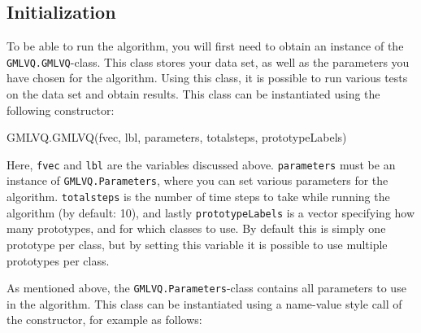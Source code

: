 \documentclass[a4paper,10pt]{article}
\begin{document}
\subsection{Initialization}
To be able to run the algorithm, you will first need to obtain an instance of the {\tt GMLVQ.GMLVQ}-class. This class stores your data set, as well as the parameters you have chosen for the algorithm. Using this class, it is possible to run various tests on the data set and obtain results. This class can be instantiated using the following constructor:

\begin{mats}
GMLVQ.GMLVQ(fvec, lbl, parameters, totalsteps, prototypeLabels)
\end{mats}
%
Here, {\tt fvec} and {\tt lbl} are the variables discussed above. {\tt parameters} must be an instance of {\tt GMLVQ.Parameters}, where you can set various parameters for the algorithm. {\tt totalsteps} is the number of time steps to take while running the algorithm (by default: 10), and lastly {\tt prototypeLabels} is a vector specifying how many prototypes, and for which classes to use. By default this is simply one prototype per class, but by setting this variable it is possible to use multiple prototypes per class.

As mentioned above, the {\tt GMLVQ.Parameters}-class contains all parameters to use in the algorithm. This class can be instantiated using a name-value style call of the constructor, for example as follows:
\end{document}

